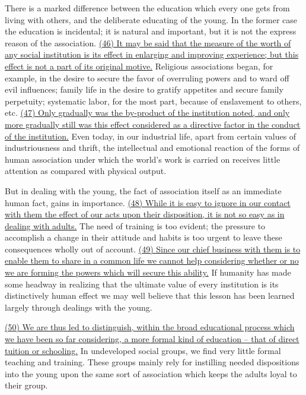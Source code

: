 \qquad There is a marked difference between the education which every one gets from living with others, and the deliberate educating of the young. In the former case the education is incidental; it is natural and important, but it is not the express reason of the association. \ul{(46) It may be said that the measure of the worth of any social institution is its effect in enlarging and improving experience; but this effect is not a part of its original motive.} Religious associations began, for example, in the desire to secure the favor of overruling powers and to ward off evil influences; family life in the desire to gratify appetites and secure family perpetuity; systematic labor, for the most part, because of enslavement to others, etc. \ul{(47) Only gradually was the by-product of the institution noted, and only more gradually still was this effect considered as a directive factor in the conduct of the institution.} Even today, in our industrial life, apart from certain values of industriousness and thrift, the intellectual and emotional reaction of the forms of human association under which the world's work is carried on receives little attention as compared with physical output.

\qquad But in dealing with the young, the fact of association itself as an immediate human fact, gains in importance. \ul{(48) While it is easy to ignore in our contact with them the effect of our acts upon their disposition, it is not so easy as in dealing with adults.} The need of training is too evident; the pressure to accomplish a change in their attitude and habits is too urgent to leave these consequences wholly out of account. \ul{(49) Since our chief business with them is to enable them to share in a common life we cannot help considering whether or no we are forming the powers which will secure this ability.} If humanity has made some headway in realizing that the ultimate value of every institution is its distinctively human effect we may well believe that this lesson has been learned largely through dealings with the young.

\qquad \ul{(50) We are thus led to distinguish, within the broad educational process which we have been so far considering, a more formal kind of education -- that of direct tuition or schooling.} In undeveloped social groups, we find very little formal teaching and training. These groups mainly rely for instilling needed dispositions into the young upon the same sort of association which keeps the adults loyal to their group.